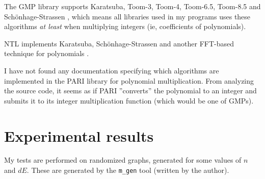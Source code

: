 \documentclass[a4paper]{article}
\newcommand{\code}{\texttt}
\begin{document}


The GMP library supports Karatsuba, Toom-3, Toom-4, Toom-6.5, Toom-8.5 and Schönhage-Strassen \cite[p 90]{gmp}, which means all libraries used in my programs uses these algorithms \emph{at least} when multiplying integers (ie, coefficients of polynomials).

NTL implements Karatsuba, Schönhage-Strassen and another FFT-based technique for polynomials \cite{ntl_zzx}.

I have not found any documentation specifying which algorithms are implemented in the PARI library for polynomial multiplication. From analyzing the source code, it seems as if PARI ''converts'' the polynomial to an integer and submits it to its integer multiplication function (which would be one of GMPs).

\section{Experimental results}
My tests are performed on randomized graphs, generated for some values of $n$ and $dE$. These are generated by the \code{m\_gen} tool (written by the author).
\end{document}

